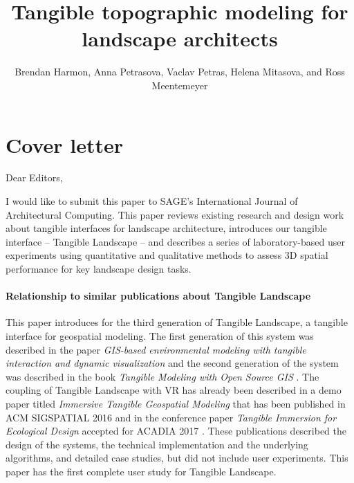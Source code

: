\documentclass[Afour,sagev,times]{sagej}
\begin{document}
\title{Tangible topographic modeling for landscape architects}
\author{Brendan Harmon, Anna Petrasova, Vaclav Petras, Helena Mitasova, and Ross Meentemeyer}


\maketitle

\section{Cover letter}

Dear Editors,

I would like to submit this paper 
to SAGE's International Journal of Architectural Computing. 
%
This paper reviews existing research and design work about 
tangible interfaces for landscape architecture,  
introduces our tangible interface -- Tangible Landscape --
and describes a series of laboratory-based user experiments
using quantitative and qualitative methods
to assess 3D spatial performance for key landscape design tasks.

\paragraph{Relationship to similar publications about Tangible Landscape}

This paper introduces
for the third generation of Tangible Landscape,
a tangible interface for geospatial modeling. 
The first generation of this system was described in the paper 
\emph{GIS-based environmental modeling with tangible interaction and dynamic visualization} \cite{Petrasova2014}
and the second generation of the system was described in the book
\emph{Tangible Modeling with Open Source GIS}
\cite{Petrasova2015}. 
The coupling of Tangible Landscape with VR
has already been described in a demo paper titled
\emph{Immersive Tangible Geospatial Modeling}
that has been published in ACM SIGSPATIAL 2016 \cite{Tabrizian2016}
and in the conference paper 
\emph{Tangible Immersion for Ecological Design}
accepted for ACADIA 2017 \cite{Tabrizian2017}. 
These publications described the design of the systems, 
the technical implementation and the underlying algorithms, 
and detailed case studies, but did not include user experiments.
%
This paper has the first complete user study for Tangible Landscape.
\end{document}
